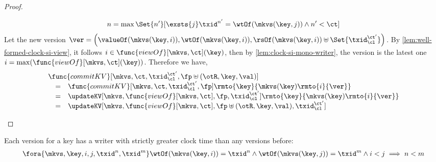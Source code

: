 \begin{proof}
\begin{itemize}
            \[
                n = \max\Set{n'}[%
                    \exsts{j} 
                    \txid^{n'} = \wtOf(\mkvs(\key, j)) 
                    \land n' < \ct%
                ] 
            \]
            Let the new version \( \ver = \left( \valueOf(\mkvs(\key,i)), \wtOf(\mkvs(\key,i)), \rsOf(\mkvs(\key,i)) \uplus \Set{\txid_\cl^{\ct'}} \right) \).
            By \cref{lem:well-formed-clock-si-view}, it follows \( i \in \func{viewOf}[\mkvs,\ct](\key) \), then by \cref{lem:clock-si-mono-writer}, the version is the latest one \( i = \max(\func{viewOf}[\mkvs,\ct](\key)) \).
            Therefore we have,
            \[
                \begin{array}{@{}l@{}}
                \func{commitKV}[\mkvs,\ct,\txid_\cl^{\ct'},\fp \uplus (\otR, \key, \val)]  \\
                \quad \begin{array}[t]{@{}c l@{}}
                = &
                \func{commitKV}[\mkvs,\ct,\txid_\cl^{\ct'},\fp]\rmto{\key}{\mkvs(\key)\rmto{i}{\ver}} \\
                = & 
                \updateKV[\mkvs,\func{viewOf}[\mkvs,\ct],\fp,\txid_\cl^{\ct'}]\rmto{\key}{\mkvs(\key)\rmto{i}{\ver}} \\
                = & 
                \updateKV[\mkvs,\func{viewOf}[\mkvs,\ct],\fp \uplus (\otR, \key, \val),\txid_\cl^{\ct'}]
                \end{array}
                \end{array}
            \]
    \end{itemize}
\end{proof}

\begin{lemma}
    \label{lem:clock-si-mono-writer}
    Each version for a key has a writer with strictly greater clock time than any versions before:
    \[
        \begin{array}{@{}l@{}}
            \fora{\mkvs,\key,i,j,\txid^n,\txid^m} 
            \wtOf(\mkvs(\key,i)) = \txid^n 
            \land \wtOf(\mkvs(\key,j)) = \txid^m 
            \land i < j
            \implies 
            n < m
        \end{array}
    \]
\end{lemma}

